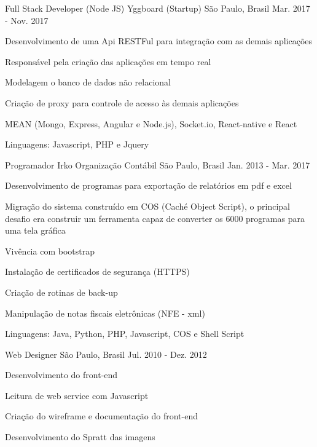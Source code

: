 \begin{cventries}
  \cventry
    {Full Stack Developer (Node JS)}
    {Yggboard (Startup)}
    {São Paulo, Brasil}
    {Mar. 2017 - Nov. 2017}
    {
      \begin{cvitems}
        \item {Desenvolvimento de uma Api RESTFul para integração com as demais aplicações}
        \item {Responsável pela criação das aplicações em tempo real}
        \item {Modelagem o banco de dados não relacional}
        \item {Criação de proxy para controle de acesso às demais aplicações}
        \item {MEAN (Mongo, Express, Angular e Node.js), Socket.io, React-native e React}
        \item {Linguagens: Javascript, PHP e Jquery}
      \end{cvitems}
    }
  \cventry
    {Programador}
    {Irko Organização Contábil}
    {São Paulo, Brasil}
    {Jan. 2013 - Mar. 2017}
    {
      \begin{cvitems}
        \item {Desenvolvimento de programas para exportação de relatórios em pdf e excel}
        \item {Migração do sistema construído em COS (Caché Object Script), o principal desafio era construir um ferramenta capaz de converter os 6000 programas para uma tela gráfica}
        \item {Vivência com bootstrap}
        \item {Instalação de certificados de segurança (HTTPS)}
        \item {Criação de rotinas de back-up}
        \item {Manipulação de notas fiscais eletrônicas (NFE - xml)}
        \item {Linguagens: Java, Python, PHP, Javascript, COS e Shell Script}
      \end{cvitems}
    }
  \cventry
    {Web Designer}
    {}
    {São Paulo, Brasil}
    {Jul. 2010 - Dez. 2012}
    {
      \begin{cvitems}
         \item {Desenvolvimento do front-end}
         \item {Leitura de web service com Javascript}
         \item {Criação do wireframe e documentação do front-end}
         \item {Desenvolvimento do Spratt das imagens}

\end{cvitems}}
\end{cventries}
